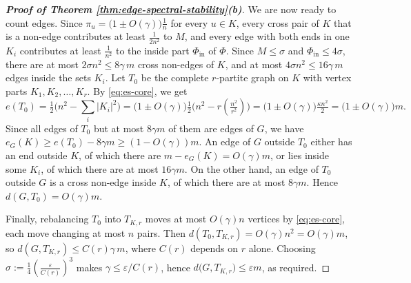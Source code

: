 \documentclass[11pt, a4paper]{article}
\theoremstyle{definition}
\theoremstyle{plain}
\renewcommand{\le}{\leqslant}
\renewcommand{\ge}{\geqslant}
\begin{document}
\begin{proof}[{\bf Proof of Theorem
\ref{thm:edge-spectral-stability}(b)}]
\smallskip 
We are now ready to count edges. 
Since $\pi_u= \big(1\pm O(\gamma ) \big) \frac{1}{n}$ for every $u\in K$, 
every cross pair of $K$ that is a
non-edge contributes at least $\frac{1}{2n^{2}}$ to $M$, and
every edge with both ends in one $K_i$ contributes at least
$\frac{1}{n^{2}}$ to the inside part $\Phi_{\mathrm{in}}$ of $\Phi$. 
Since $M\le \sigma$ and $\Phi_{\mathrm{in}} \le 4\sigma$, 
there are at most $2\sigma n^{2}\le 8\gamma \, m$ cross non-edges of $K$, 
and at most $4\sigma n^{2}\le 16\gamma \, m$ edges inside the sets $K_i$. Let $T_0$ be the complete $r$-partite graph on $K$
with vertex parts $K_1,K_2,\ldots ,K_r$. 
By \eqref{eq:es-core}, 
we get  
$$ e(T_0)=\tfrac12\bigl(n^{2}- {\textstyle \sum_{i}} |K_i|^{2}\bigr) 
= \big(1\pm O(\gamma ) \big) \tfrac{1}{2} \Big(n^2 - r(\tfrac{n^2}{r^2}) \Big) 
= \big(1\pm O(\gamma ) \big)\tfrac{\kappa n^{2}}{2}
= \big(1\pm O(\gamma ) \big)m.$$ 
Since all edges of $T_0$ but at most
$8\gamma m$ of them are edges of $G$, we have 
$e_G(K) \ge e(T_0) - 8\gamma m \ge (1-O(\gamma ))m$. An edge of $G$ outside $T_0$
 either has an end outside $K$, of which there are
$m-e_G(K)=O(\gamma )m$, or lies inside some $K_i$, of which
there are at most $16\gamma m$. 
On the other hand, 
an edge of $T_0$ outside
$G$ is a cross non-edge inside $K$, of which there are at
most $8\gamma m$. Hence $d(G,T_0)=O(\gamma )m$.

Finally, rebalancing $T_0$ into $T_{K,r}$ moves at most
$O(\gamma )n$ vertices by \eqref{eq:es-core}, each move
changing at most $n$ pairs. 
Then $d(T_0,T_{K,r}) = O(\gamma)n^2 =O(\gamma) m$, 
so $d (G,T_{K,r})\le  C(r) \gamma \, m$, where $C(r)$
depends on $r$ alone. Choosing
$\sigma :=\frac14 (\frac{\varepsilon}{C(r)})^{3}$
makes $\gamma \le \varepsilon /C(r)$, hence
$d\bigl(G,T_{K,r}\bigr)\le \varepsilon m$, as required.
\end{proof}
\end{document}
